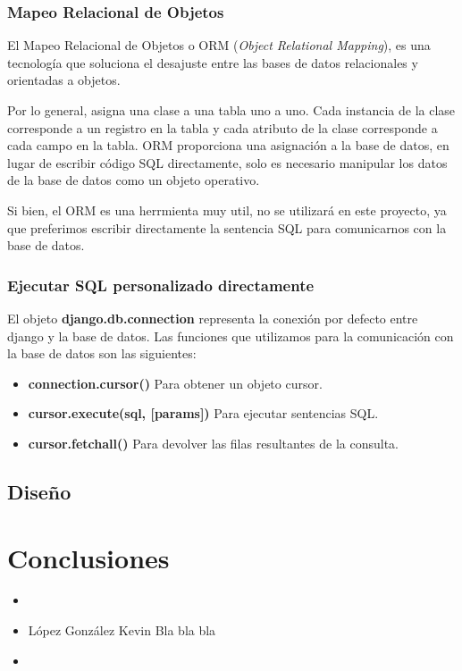 \documentclass[12pt,letterpaper]{article}
\begin{document}
			\subsubsection{Mapeo Relacional de Objetos}
			El Mapeo Relacional de Objetos o ORM (\textit{Object Relational Mapping}), es una tecnología que soluciona el desajuste entre las bases de datos relacionales y orientadas a objetos.\par 
			Por lo general, asigna una clase a una tabla uno a uno. Cada instancia de la clase corresponde a un registro en la tabla y cada atributo de la clase corresponde a cada campo en la tabla. ORM proporciona una asignación a la base de datos, en lugar de escribir código SQL directamente, solo es necesario manipular los datos de la base de datos como un objeto operativo.\par 
			Si bien, el ORM es una herrmienta muy util, no se utilizará en este proyecto, ya que preferimos escribir directamente la sentencia SQL para comunicarnos con la base de datos.
			
			\subsubsection{Ejecutar SQL personalizado directamente}
			El objeto \textbf{django.db.connection} representa la conexión por defecto entre django y la base de datos. Las funciones que utilizamos para la comunicación con la base de datos son las siguientes:
			\begin{itemize}
				\item \textbf{connection.cursor()}
					\subitem Para obtener un objeto cursor.
					
				\item \textbf{cursor.execute(sql, [params])}
					\subitem Para ejecutar sentencias SQL.
					
				\item \textbf{cursor.fetchall()}
					\subitem Para devolver las filas resultantes de la consulta.
			\end{itemize}
		
		\subsection{Diseño}
		
	
	\section{Conclusiones}
		\begin{itemize}
			\item 
				\subitem 
				
			\item López González Kevin
				\subitem Bla bla bla

			\item 
				\subitem
		\end{itemize}

	
\end{document}
